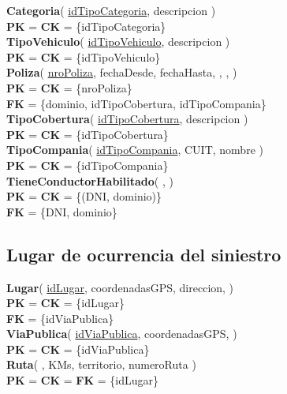 \textbf{Categoria}(
    \uline{idTipoCategoria},
    descripcion
)\\
\textbf{PK} = \textbf{CK} = \{idTipoCategoria\}\\

\textbf{TipoVehiculo}(
    \uline{idTipoVehiculo},
    descripcion
)\\
\textbf{PK} = \textbf{CK} = \{idTipoVehiculo\}\\

\textbf{Poliza}(
    \uline{nroPoliza},
    fechaDesde,
    fechaHasta,
    ,
    ,
)\\
\textbf{PK} = \textbf{CK} = \{nroPoliza\}\\
\textbf{FK} = \{dominio, idTipoCobertura, idTipoCompania\}\\

\textbf{TipoCobertura}(
    \uline{idTipoCobertura},
    descripcion
)\\
\textbf{PK} = \textbf{CK} = \{idTipoCobertura\}\\

\textbf{TipoCompania}(
    \uline{idTipoCompania},
    CUIT,
    nombre
)\\
\textbf{PK} = \textbf{CK} = \{idTipoCompania\}\\

\textbf{TieneConductorHabilitado}(
    \uline{},
    \uline{}
)\\
\textbf{PK} = \textbf{CK} = \{(DNI, dominio)\}\\
\textbf{FK} = \{DNI, dominio\}



\subsection{Lugar de ocurrencia del siniestro}

\textbf{Lugar}(
    \uline{idLugar},
    coordenadasGPS,
    direccion,
)\\
\textbf{PK} = \textbf{CK} = \{idLugar\}\\
\textbf{FK} = \{idViaPublica\}\\

\textbf{ViaPublica}(
    \uline{idViaPublica},
    coordenadasGPS,
)\\
\textbf{PK} = \textbf{CK} = \{idViaPublica\}\\


\textbf{Ruta}(
    \uline{},
    KMs,
    territorio,
    numeroRuta
)\\
\textbf{PK} = \textbf{CK} = \textbf{FK} = \{idLugar\}\\

